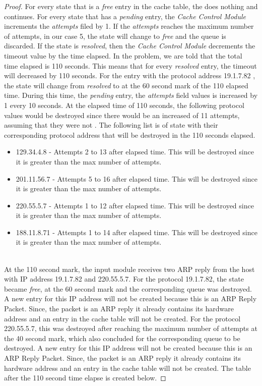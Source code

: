 \documentclass[12pt]{article}
\begin{document}
\begin{proof}
For every state that is a \textit{free} entry in the cache table, the  does nothing and continues. For every state that has a \textit{pending} entry, the \textit{Cache Control Module} increments the \textit{attempts} filed by 1. If the \textit{attempts} reaches the maximum number of attempts, in our case 5, the state will change to \textit{free} and the queue is discarded. If the state is \textit{resolved}, then the \textit{Cache Control Module} decrements the timeout value by the time elapsed. In the problem, we are told that the total time elapsed is 110 seconds. This means that for every \textit{resolved} entry, the timeout will decreased by 110 seconds. For the entry with the protocol address 19.1.7.82 , the state will change from \textit{resolved} to  at the 60 second mark of the 110 elapsed time. During this time, the \textit{pending} entry, the \textit{attempts} field values is increased by 1 every 10 seconds. At the elapsed time of 110 seconds, the following protocol values would be destroyed since there would be an increased of 11 attempts, assuming that they were not . The following list is of  state with their corresponding protocol address that will be destroyed in the 110 seconds elapsed. 
\\
\begin{itemize}
    \item 129.34.4.8 - Attempts 2 to 13 after elapsed time. This will be destroyed since it is greater than the max number of attempts.
    \item 201.11.56.7 - Attempts 5 to 16 after elapsed time. This will be destroyed since it is greater than the max number of attempts.
    \item 220.55.5.7 - Attempts 1 to 12 after elapsed time. This will be destroyed since it is greater than the max number of attempts.
    \item 188.11.8.71 - Attempts 1 to 14 after elapsed time. This will be destroyed since it is greater than the max number of attempts.
\end{itemize}
\\
At the 110 second mark, the input module receives two ARP reply from the host with IP address 19.1.7.82 and 220.55.5.7. For the protocol 19.1.7.82, the state became \textit{free}, at the 60 second mark and the corresponding queue was destroyed. A new entry for this IP address will not be created because this is an ARP Reply Packet. Since, the packet is an ARP reply it already contains its hardware address and an entry in the cache table will not be created. For the protocol 220.55.5.7, this was destroyed after reaching the maximum number of attempts at the 40 second mark, which also concluded for the corresponding queue to be destroyed. A new entry for this IP address will not be created because this is an ARP Reply Packet. Since, the packet is an ARP reply it already contains its hardware address and an entry in the cache table will not be created. The table after the 110 second time elapse is created below. 

\end{proof}
\end{document}
